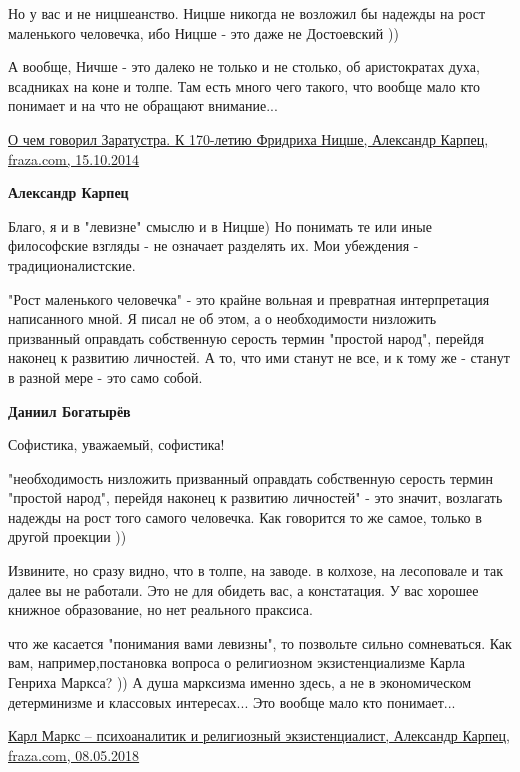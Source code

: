 \begin{itemize}
\begin{itemize}
Но у вас и не ницшеанство. Ницше никогда не возложил бы надежды на рост
маленького человечка, ибо Ницше - это даже не Достоевский ))

А вообще, Ничше - это далеко не только и не столько, об аристократах духа,
всадниках на коне и толпе. Там есть много чего такого, что вообще мало кто
понимает и на что не обращают внимание...


\href{https://fraza.com/analytics/208276-o_chem_govoril_zaratustra_k_170_letiju_fridriha_nitsshe}{%
О чем говорил Заратустра. К 170-летию Фридриха Ницше, Александр Карпец, fraza.com, 15.10.2014%
}

\textbf{Александр Карпец} 

Благо, я и в "левизне" смыслю и в Ницше) Но понимать те или иные философские
взгляды - не означает разделять их. Мои убеждения - традиционалистские.

"Рост маленького человечка" - это крайне вольная и превратная интерпретация
написанного мной. Я писал не об этом, а о необходимости низложить призванный
оправдать собственную серость термин "простой народ", перейдя наконец к
развитию личностей. А то, что ими станут не все, и к тому же - станут в разной
мере - это само собой.

\textbf{Даниил Богатырёв} 

Софистика, уважаемый, софистика!

"необходимость низложить призванный оправдать собственную серость термин
"простой народ", перейдя наконец к развитию личностей" - это значит, возлагать
надежды на рост того самого человечка. Как говорится то же самое, только в
другой проекции ))

Извините, но сразу видно, что в толпе, на заводе. в колхозе, на лесоповале и
так далее вы не работали. Это не для обидеть вас, а констатация. У вас хорошее
книжное образование, но нет реального праксиса.

что же касается "понимания вами левизны", то позвольте сильно сомневаться. Как
вам, например,постановка вопроса о религиозном экзистенциализме Карла Генриха
Маркса? )) А душа марксизма именно здесь, а не в экономическом детерминизме и
классовых интересах... Это вообще мало кто понимает...


\href{https://fraza.com/analytics/268772-karl-marks-psihoanalitik-i-religioznyj-ekzistentsialist}{%
Карл Маркс – психоаналитик и религиозный экзистенциалист, Александр Карпец, fraza.com, 08.05.2018%
}


\end{itemize}
\end{itemize}
